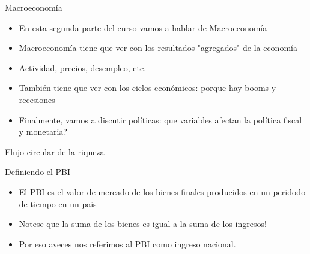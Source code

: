 \documentclass{beamer}
\begin{document}
\begin{frame}{Macroeconomía}
   \begin{itemize}
       \item En esta segunda parte del curso vamos a hablar de Macroeconomía
       \item Macroeconomía tiene que ver con los resultados "agregados" de la economía
       \item Actividad, precios, desempleo, etc. 
       \item También tiene que ver con los ciclos económicos: porque hay booms y recesiones
       \item Finalmente, vamos a discutir políticas: que variables afectan la política fiscal y monetaria? 
   \end{itemize} 
\end{frame}


\begin{frame}{Flujo circular de la riqueza}
    \begin{figure} [H]
\centering
{}
\label{fig:25.1}
\end{figure} 

\end{frame}


\begin{frame}{Definiendo el PBI}
\begin{itemize}
   \item El PBI es el valor de mercado de los bienes finales producidos en un peridodo de tiempo en un pais
   \item Notese que la suma de los bienes es igual a la suma de los ingresos!
   \item Por eso aveces nos referimos al PBI como ingreso nacional.
   \end{itemize}
\end{frame}
\end{document}
